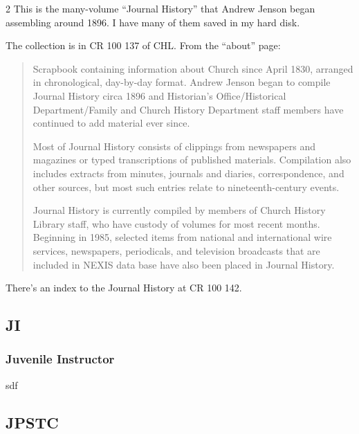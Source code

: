 \begin{multicols}{2}
			This is the many-volume ``Journal History'' that Andrew Jenson began assembling around 1896. I have many of them saved in my hard disk.
			
			The collection is in CR 100 137 of CHL. From the ``about'' page:
			
				\begin{quote}
				Scrapbook containing information about Church since April 1830, arranged in chronological, day-by-day format. Andrew Jenson began to compile Journal History circa 1896 and Historian's Office/Historical Department/Family and Church History Department staff members have continued to add material ever since.

				Most of Journal History consists of clippings from newspapers and magazines or typed transcriptions of published materials. Compilation also includes extracts from minutes, journals and diaries, correspondence, and other sources, but most such entries relate to nineteenth-century events.

				Journal History is currently compiled by members of Church History Library staff, who have custody of volumes for most recent months. Beginning in 1985, selected items from national and international wire services, newspapers, periodicals, and television broadcasts that are included in NEXIS data base have also been placed in Journal History.
				\end{quote}
				
			There's an index to the Journal History at CR 100 142.
	
	\subsection*{JI}
	
		\subsubsection*{Juvenile Instructor}
		
			sdf
			
	\subsection*{JPSTC}
	

\end{multicols}
